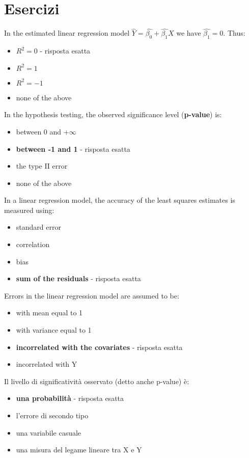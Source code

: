 \section{Esercizi}

In the estimated linear regression model $\hat{Y} = \hat{\beta_0} + \hat{\beta_1}X$ we have $\hat{\beta_1} = 0$. Thus:

\begin{itemize}
\item \textbf{$R^2 = 0$} - risposta esatta
\item $R^2 = 1$
\item $R^2 = -1$
\item none of the above
\end{itemize}

In the hypothesis testing, the observed significance level (\textbf{p-value}) is:

\begin{itemize}
\item between 0 and $+\infty$
\item \textbf{between -1 and 1} - risposta esatta
\item the type II error
\item none of the above
\end{itemize}

In a linear regression model, the accuracy of the least squares estimates is measured using:

\begin{itemize}
\item standard error
\item correlation
\item bias
\item \textbf{sum of the residuals} - risposta esatta
\end{itemize}

Errors in the linear regression model are assumed to be:

\begin{itemize}
\item with mean equal to 1
\item with variance equal to 1
\item \textbf{incorrelated with the covariates} - risposta esatta
\item incorrelated with Y
\end{itemize}

Il livello di significatività osservato (detto anche p-value) è:

\begin{itemize}
\item \textbf{una probabilità} - risposta esatta
\item l'errore di secondo tipo
\item una variabile casuale
\item una misura del legame lineare tra X e Y
\end{itemize}













